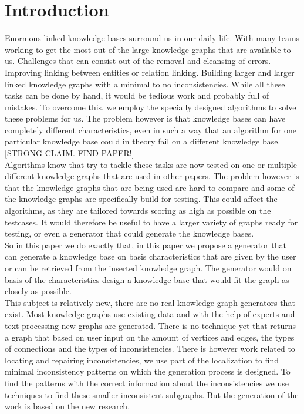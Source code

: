 \documentclass{article}
\begin{document}
\section{Introduction}
Enormous linked knowledge bases surround us in our daily life. With many teams working to get the most out of the large knowledge graphs that are available to us. Challenges that can consist out of the removal and cleansing of errors. Improving linking between entities or relation linking. Building larger and larger linked knowledge graphs with a minimal to no inconsistencies. While all these tasks can be done by hand, it would be tedious work and probably full of mistakes. To overcome this, we employ the specially designed algorithms to solve these problems for us. The problem however is that knowledge bases can have completely different characteristics, even in such a way that an algorithm for one particular knowledge base could in theory fail on a different knowledge base. [STRONG CLAIM. FIND PAPER!]\\
Algorithms know that try to tackle these tasks are now tested on one or multiple different knowledge graphs that are used in other papers. The problem however is that the knowledge graphs that are being used are hard to compare and some of the knowledge graphs are specifically build for testing. This could affect the algorithms, as they are tailored towards scoring as high as possible on the testcases. It would therefore be useful to have a larger variety of graphs ready for testing, or even a generator that could generate the knowledge bases.\\
So in this paper we do exactly that, in this paper we propose a generator that can generate a knowledge base on basis characteristics that are given by the user or can be retrieved from the inserted knowledge graph. The generator would on basis of the characteristics design a knowledge base that would fit the graph as closely as possible.  \\
This subject is relatively new, there are no real knowledge graph generators that exist. Most knowledge graphs use existing data and with the help of experts and text processing new graphs are generated. There is no technique yet that returns a graph that based on user input on the amount of vertices and edges, the types of connections and the types of inconsistencies. There is however work related to locating and repairing inconsistencies, we use part of the localization to find minimal inconsistency patterns on which the generation process is designed. To find the patterns with the correct information about the inconsistencies we use techniques to find these smaller inconsistent subgraphs. But the generation of the work is based on the new research.\\ %
\end{document}
